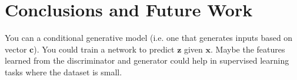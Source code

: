 \documentclass[a4paper]{article}
\begin{document}
\section{Conclusions and Future Work}
You can a conditional generative model (i.e. one that generates inputs based
on vector $\bm{c}$). You could train a network to predict $\bm{z}$ given
$\bm{x}$. Maybe the features learned from the discriminator and generator
could help in supervised learning tasks where the dataset is small.
\end{document}
